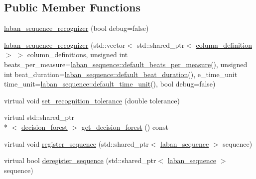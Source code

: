 \subsection*{Public Member Functions}
\begin{DoxyCompactItemize}
\item 
\hyperlink{classmae_1_1fl_1_1laban_1_1laban__sequence__recognizer_ac8bcf4bda67c74efb755aaac707def33}{laban\-\_\-sequence\-\_\-recognizer} (bool debug=false)
\item 
\hyperlink{classmae_1_1fl_1_1laban_1_1laban__sequence__recognizer_a74b400fd80ee4dd76588a0e938a6adc6}{laban\-\_\-sequence\-\_\-recognizer} (std\-::vector$<$ std\-::shared\-\_\-ptr$<$ \hyperlink{classmae_1_1fl_1_1laban_1_1column__definition}{column\-\_\-definition} $>$ $>$ column\-\_\-definitions, unsigned int beats\-\_\-per\-\_\-measure=\hyperlink{classmae_1_1fl_1_1laban_1_1laban__sequence_a2e64362d5cfeb89eb8545cb064e63170}{laban\-\_\-sequence\-::default\-\_\-beats\-\_\-per\-\_\-measure}(), unsigned int beat\-\_\-duration=\hyperlink{classmae_1_1fl_1_1laban_1_1laban__sequence_ac7bf04cdac0c3aed6b8ee4a887e561d9}{laban\-\_\-sequence\-::default\-\_\-beat\-\_\-duration}(), e\-\_\-time\-\_\-unit time\-\_\-unit=\hyperlink{classmae_1_1fl_1_1laban_1_1laban__sequence_ada28215d43d85e983fe6129e9816eed2}{laban\-\_\-sequence\-::default\-\_\-time\-\_\-unit}(), bool debug=false)
\item 
virtual void \hyperlink{classmae_1_1fl_1_1laban_1_1laban__sequence__recognizer_a2a6255ac083530269ca80a74c1b01a68}{set\-\_\-recognition\-\_\-tolerance} (double tolerance)
\item 
virtual std\-::shared\-\_\-ptr\\*
$<$ \hyperlink{classmae_1_1fl_1_1laban_1_1decision__forest}{decision\-\_\-forest} $>$ \hyperlink{classmae_1_1fl_1_1laban_1_1laban__sequence__recognizer_a6886968fe42d7d98d58ffb3c8a232a17}{get\-\_\-decision\-\_\-forest} () const 
\item 
virtual void \hyperlink{classmae_1_1fl_1_1laban_1_1laban__sequence__recognizer_a5275a3620709af2f4ff984382029a89e}{register\-\_\-sequence} (std\-::shared\-\_\-ptr$<$ \hyperlink{classmae_1_1fl_1_1laban_1_1laban__sequence}{laban\-\_\-sequence} $>$ sequence)
\item 
virtual bool \hyperlink{classmae_1_1fl_1_1laban_1_1laban__sequence__recognizer_a31410c5237b11f78e0ecdbc664157adf}{deregister\-\_\-sequence} (std\-::shared\-\_\-ptr$<$ \hyperlink{classmae_1_1fl_1_1laban_1_1laban__sequence}{laban\-\_\-sequence} $>$ sequence)
\item 

\end{DoxyCompactItemize}
